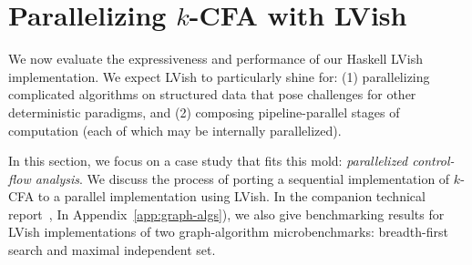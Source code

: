 \section{Parallelizing $k$-CFA with LVish} \label{s:lvish-k-cfa}


We now evaluate 
the expressiveness and performance of our Haskell LVish implementation.
We expect LVish to particularly shine for:
  (1) parallelizing complicated algorithms on structured data that pose 
    challenges for other deterministic paradigms, and 
  (2) composing pipeline-parallel stages of computation 
     (each of which may be internally parallelized).



In this section, we focus on a case study that fits this mold:
\emph{parallelized control-flow analysis}.  We discuss the process of
porting a sequential implementation of $k$-CFA to a parallel
implementation using LVish.
\ifx\fulltr\undefined
In the companion technical
report~\cite{Freeze-TR}, 
\else
In Appendix~\ref{app:graph-algs}),
\fi
we also give benchmarking results for LVish
implementations of two graph-algorithm microbenchmarks: breadth-first
search and maximal independent set.







